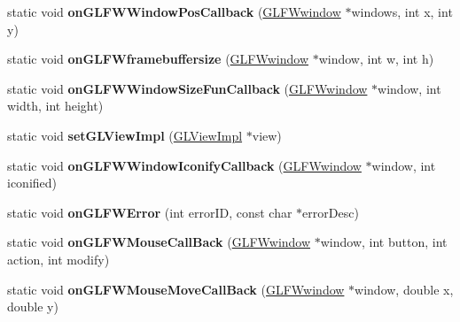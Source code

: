 \begin{DoxyCompactItemize}
\item 
\mbox{\label{classGLFWEventHandler_a3c2b6c9a0e9b7cf339864f2385f1cf47}} 
static void {\bfseries on\+G\+L\+F\+W\+Window\+Pos\+Callback} (\hyperlink{group__window_ga3c96d80d363e67d13a41b5d1821f3242}{G\+L\+F\+Wwindow} $\ast$windows, int x, int y)
\item 
\mbox{\label{classGLFWEventHandler_af5efd78f04c6b309b30718c639ea4560}} 
static void {\bfseries on\+G\+L\+F\+Wframebuffersize} (\hyperlink{group__window_ga3c96d80d363e67d13a41b5d1821f3242}{G\+L\+F\+Wwindow} $\ast$window, int w, int h)
\item 
\mbox{\label{classGLFWEventHandler_ada92a784331121435a825b4be9102872}} 
static void {\bfseries on\+G\+L\+F\+W\+Window\+Size\+Fun\+Callback} (\hyperlink{group__window_ga3c96d80d363e67d13a41b5d1821f3242}{G\+L\+F\+Wwindow} $\ast$window, int width, int height)
\item 
\mbox{\label{classGLFWEventHandler_a62c82d89d5c00b1edb4c35afe496a38a}} 
static void {\bfseries set\+G\+L\+View\+Impl} (\hyperlink{classGLViewImpl}{G\+L\+View\+Impl} $\ast$view)
\item 
\mbox{\label{classGLFWEventHandler_a2d3ac5fa7d7c506b394993cd4b7cc260}} 
static void {\bfseries on\+G\+L\+F\+W\+Window\+Iconify\+Callback} (\hyperlink{group__window_ga3c96d80d363e67d13a41b5d1821f3242}{G\+L\+F\+Wwindow} $\ast$window, int iconified)
\item 
\mbox{\label{classGLFWEventHandler_a722b49ee8039ee27118274a5ab7a5624}} 
static void {\bfseries on\+G\+L\+F\+W\+Error} (int error\+ID, const char $\ast$error\+Desc)
\item 
\mbox{\label{classGLFWEventHandler_ac63179c4eb927a12f1b3c5466d4b4b04}} 
static void {\bfseries on\+G\+L\+F\+W\+Mouse\+Call\+Back} (\hyperlink{group__window_ga3c96d80d363e67d13a41b5d1821f3242}{G\+L\+F\+Wwindow} $\ast$window, int button, int action, int modify)
\item 
\mbox{\label{classGLFWEventHandler_a3225fcc79aa6f3661745967c1385b43c}} 
static void {\bfseries on\+G\+L\+F\+W\+Mouse\+Move\+Call\+Back} (\hyperlink{group__window_ga3c96d80d363e67d13a41b5d1821f3242}{G\+L\+F\+Wwindow} $\ast$window, double x, double y)

\end{DoxyCompactItemize}
